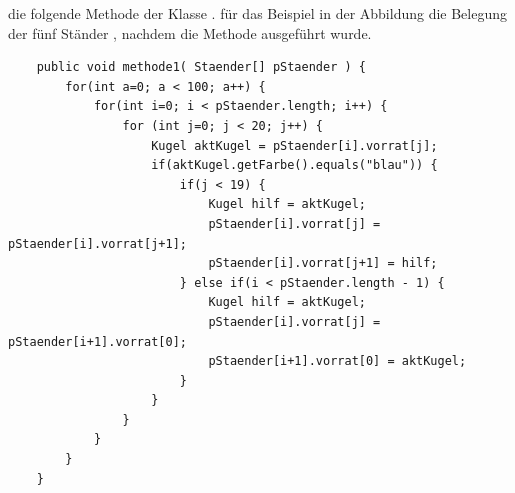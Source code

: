 \documentclass[10pt, a4paper, ngerman]{arbeitsblatt}
\begin{document}
\begin{aufgabe}
\begin{enuma}
	 die folgende Methode der Klasse .  für das Beispiel in der Abbildung die Belegung der fünf Ständer , nachdem die Methode ausgeführt wurde.

	\begin{verbatim}
	public void methode1( Staender[] pStaender ) {
		for(int a=0; a < 100; a++) {
			for(int i=0; i < pStaender.length; i++) {
				for (int j=0; j < 20; j++) {
					Kugel aktKugel = pStaender[i].vorrat[j];
					if(aktKugel.getFarbe().equals("blau")) {
						if(j < 19) {
							Kugel hilf = aktKugel;
							pStaender[i].vorrat[j] = pStaender[i].vorrat[j+1];
							pStaender[i].vorrat[j+1] = hilf;
						} else if(i < pStaender.length - 1) {
							Kugel hilf = aktKugel;
							pStaender[i].vorrat[j] = pStaender[i+1].vorrat[0];
							pStaender[i+1].vorrat[0] = aktKugel;
						}
					}
				}
			}
		}
	}
	\end{verbatim}
\end{enuma}
\end{aufgabe}
\end{document}
